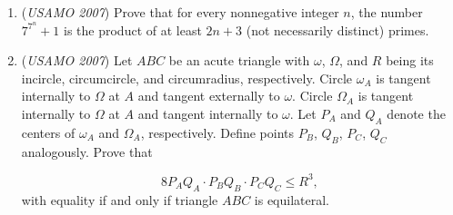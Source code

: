 \begin{enumerate}
	\item (\textit{USAMO 2007}) Prove that for every nonnegative integer $n$, the number $7^{7^n}+1$ is the product of at least $2n+3$ (not necessarily distinct) primes.


 

	\item (\textit{USAMO 2007}) Let $ABC$ be an acute triangle with $\omega$, $\Omega$, and $R$ being its incircle, circumcircle, and circumradius, respectively. Circle $\omega_A$ is tangent internally to $\Omega$ at $A$ and tangent externally to $\omega$. Circle $\Omega_A$ is tangent internally to $\Omega$ at $A$ and tangent internally to $\omega$. Let $P_A$ and $Q_A$ denote the centers of $\omega_A$ and $\Omega_A$, respectively.  Define points $P_B$, $Q_B$, $P_C$, $Q_C$ analogously.  Prove that

 \[8P_AQ_A \cdot P_BQ_B \cdot P_CQ_C \le R^3,\]
with equality if and only if triangle $ABC$ is equilateral.


 

\end{enumerate}